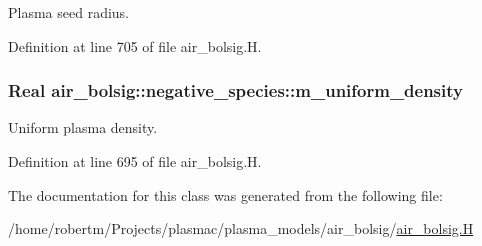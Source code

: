Plasma seed radius. 



Definition at line 705 of file air\+\_\+bolsig.\+H.

\subsubsection[{\texorpdfstring{m\+\_\+uniform\+\_\+density}{m_uniform_density}}]{\setlength{\rightskip}{0pt plus 5cm}Real air\+\_\+bolsig\+::negative\+\_\+species\+::m\+\_\+uniform\+\_\+density}\hypertarget{classair__bolsig_1_1negative__species_a4621b1fd5e10bc71a7021896b0c886e5}{}\label{classair__bolsig_1_1negative__species_a4621b1fd5e10bc71a7021896b0c886e5}


Uniform plasma density. 



Definition at line 695 of file air\+\_\+bolsig.\+H.



The documentation for this class was generated from the following file\+:\begin{DoxyCompactItemize}
\item 
/home/robertm/\+Projects/plasmac/plasma\+\_\+models/air\+\_\+bolsig/\hyperlink{air__bolsig_8H}{air\+\_\+bolsig.\+H}\end{DoxyCompactItemize}
